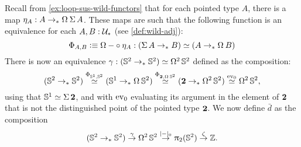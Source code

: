\documentclass[english,a4paper]{lmcs}
\begin{document}
Recall from \cref{ex:loop-sus-wild-functors} that for each pointed type $A$,
there is a map $\eta_A : A \ptdto \loopspace\null \susp A$. These maps are such
that the following function is an equivalence for each $A,B:\mathcal{U}_*$ (see
\cref{def:wild-adj}):
\begin{equation}
  \Phi_{A,B} \defequi \loopspace \null \blank \circ \eta_A :  (\susp A \ptdto B) \weq (A \ptdto \loopspace \null B)
  \label{eq:triangle-identity-unit}
\end{equation}
There is now an equivalence $\gamma:({{\mathbb S^{2}}} \to_\ast {{\mathbb S^{2}}}) \simeq \mathop{\Omega^{2}} {{\mathbb S^{2}}}$ defined as
the composition:
\begin{displaymath}
  (\Sp \ptdto \Sp) \stackrel{\Phi_{\Sc,\Sp}}\weq
  (\Sc \ptdto\loopspace\null \Sp) \stackrel{\Phi_{\bn 2,\loopspace\null\Sp}}\weq
  (\bn 2\ptdto\loopspace 2 \Sp) \stackrel{\ev_0}\weq
  \loopspace 2 \Sp,
\end{displaymath}
using that ${{\mathbb S^{1}}} \simeq \operatorname{\Sigma}{\mathbf{2}}$, and with $\mathrm{ev}_0$ evaluating its argument
in the element of $\mathbf{2}$ that is not the distinguished point of the pointed type $\mathbf{2}$.
We now define $\bar d$ as the composition
\begin{displaymath}
  ({{\mathbb S^{2}}} \to_\ast {{\mathbb S^{2}}}) \stackrel \gamma \to \mathop{\Omega^{2}} {{\mathbb S^{2}}} \stackrel {\lvert\mathord{{-}}\rvert_0} \to
  \uppi_{2}({{\mathbb S^{2}}}) \stackrel \zeta \to \mathbb{Z}.
\end{displaymath}
\end{document}
